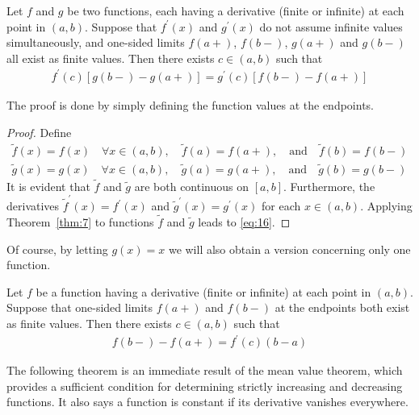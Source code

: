 \documentclass[thmcnt=section, 12pt]{my-elegantbook}
\begin{document}
\begin{theorem} \label{thm:84}
    Let $f$ and $g$ be two functions, each having a derivative (finite or infinite) at each point in $(a, b)$. Suppose that $f^\prime(x)$ and $g^\prime(x)$ do not assume infinite values simultaneously, and one-sided limits $f(a+)$, $f(b-)$, $g(a+)$ and $g(b-)$ all exist as finite values. Then there exists $c \in (a, b)$ such that
    \begin{align}
        f^\prime(c) [g(b-) - g(a+)]
        = g^\prime(c) [f(b-) - f(a+)]
        \label{eq:16}
    \end{align}
\end{theorem}

\par The proof is done by simply defining the function values at the endpoints.

\begin{proof}
    Define
    \begin{align*}
        \tilde{f}(x) = f(x) \quad \forall x \in (a, b),
        \quad
        \tilde{f}(a) = f(a+),
        \quad \text{and} \quad
        \tilde{f}(b) = f(b-) \\
        \tilde{g}(x) = g(x) \quad \forall x \in (a, b),
        \quad
        \tilde{g}(a) = g(a+),
        \quad \text{and} \quad
        \tilde{g}(b) = g(b-)
    \end{align*}
    It is evident that $\tilde{f}$ and $\tilde{g}$ are both continuous on $[a, b]$. Furthermore, the derivatives $\tilde{f}^\prime(x) = f^\prime(x)$ and $\tilde{g}^\prime(x) = g^\prime(x)$ for each $x \in (a, b)$. Applying Theorem~\ref{thm:7} to functions $\tilde{f}$ and $\tilde{g}$ leads to \eqref{eq:16}.
\end{proof}

Of course, by letting $g(x) = x$
we will also obtain a version concerning
only one function.

\begin{theorem} \label{thm:85}
    Let $f$ be a function having
    a derivative (finite or infinite)
    at each point in $(a, b)$.
    Suppose that one-sided limits $f(a+)$ and $f(b-)$ at the endpoints
    both exist as finite values.
    Then there exists $c \in (a, b)$ such that
    \begin{align*}
        f(b-) - f(a+)
        = f^\prime(c) (b - a)
    \end{align*}
\end{theorem}


\par The following theorem is an immediate result of the mean value theorem, which provides a sufficient condition for determining strictly increasing and decreasing functions. It also says a function is constant if its derivative vanishes everywhere.
\end{document}
